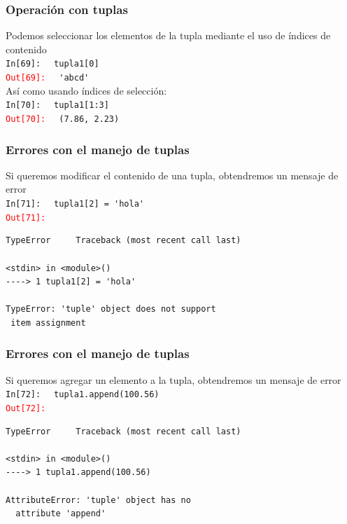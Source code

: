 {\begin{frame}[fragile]
\frametitle{Operación con tuplas}
Podemos seleccionar los elementos de la tupla mediante el uso de índices de contenido
\\
\bigskip
\textcolor{ao}{\texttt{In[69]: }} \verb| tupla1[0]|
\\
\pause
\textcolor{red}{\texttt{Out[69]: }} \verb| 'abcd'|
\\
\bigskip
\pause
Así como usando índices de selección:
\\
\bigskip
\textcolor{ao}{\texttt{In[70]: }} \verb| tupla1[1:3]|
\\
\pause
\textcolor{red}{\texttt{Out[70]: }} \verb| (7.86, 2.23)|
\end{frame}
\begin{frame}[fragile]
\frametitle{Errores con el manejo de tuplas}
Si queremos modificar el contenido de una tupla, obtendremos un mensaje de error
\\
\bigskip
\textcolor{ao}{\texttt{In[71]: }} \verb| tupla1[2] = 'hola'|
\\
\pause
\textcolor{red}{\texttt{Out[71]: }} 
\begingroup
\fontsize{12}{12}\selectfont
\begin{verbatim}
TypeError     Traceback (most recent call last)

<stdin> in <module>()
----> 1 tupla1[2] = 'hola'

TypeError: 'tuple' object does not support
 item assignment
\end{verbatim}
\endgroup
\end{frame}
\begin{frame}[fragile]
\frametitle{Errores con el manejo de tuplas}
Si queremos agregar un elemento a la tupla, obtendremos un mensaje de error
\\
\bigskip
\textcolor{ao}{\texttt{In[72]: }} \verb| tupla1.append(100.56)|
\\
\pause
\textcolor{red}{\texttt{Out[72]: }} 
\begingroup
\fontsize{12}{12}\selectfont
\begin{verbatim}
TypeError     Traceback (most recent call last)

<stdin> in <module>()
----> 1 tupla1.append(100.56)

AttributeError: 'tuple' object has no 
  attribute 'append'
\end{verbatim}
\endgroup
\end{frame}
}
